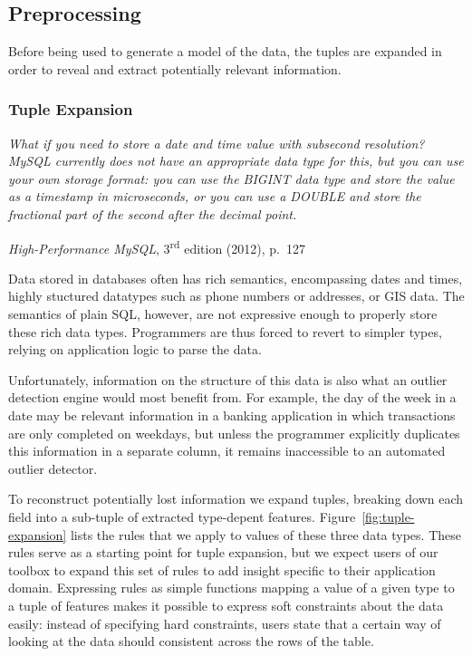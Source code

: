 \subsection{Preprocessing}
\label{sec:preprocessing}

Before being used to generate a model of the data, the tuples are expanded in order to reveal and extract potentially relevant information.

\subsubsection{Tuple Expansion}

\noindent
\begin{minipage}{\linewidth}
  \begin{minipage}{0.8\linewidth}
    \itshape
    What if you need to store a date and time value with subsecond resolution? MySQL
    currently does not have an appropriate data type for this, but you can use your own
    storage format: you can use the BIGINT data type and store the value as a timestamp in
    microseconds, or you can use a DOUBLE and store the fractional part of the second after
    the decimal point.
  \end{minipage}
  \begin{flushright}
    \textit{High-Performance MySQL}, 3\textsuperscript{rd} edition (2012), p.~127
  \end{flushright}
\end{minipage}\vspace{\figurepadding}

Data stored in databases often has rich semantics, encompassing dates and times, highly stuctured datatypes such as phone numbers or addresses, or GIS data. The semantics of plain SQL, however, are not expressive enough to properly store these rich data types. Programmers are thus forced to revert to simpler types, relying on application logic to parse the data.

Unfortunately, information on the structure of this data is also what an outlier detection engine would most benefit from. For example, the day of the week in a date may be relevant information in a banking application in which transactions are only completed on weekdays, but unless the programmer explicitly duplicates this information in a separate column, it remains inaccessible to an automated outlier detector.

To reconstruct potentially lost information we expand tuples, breaking down each field into a sub-tuple of extracted type-depent features. Figure~\ref{fig:tuple-expansion} lists the rules that we apply to values of these three data types. These rules serve as a starting point for tuple expansion, but we expect users of our toolbox to expand this set of rules to add insight specific to their application domain. Expressing rules as simple functions mapping a value of a given type to a tuple of features makes it possible to express soft constraints about the data easily: instead of specifying hard constraints, users state that a certain way of looking at the data should consistent across the rows of the table.


